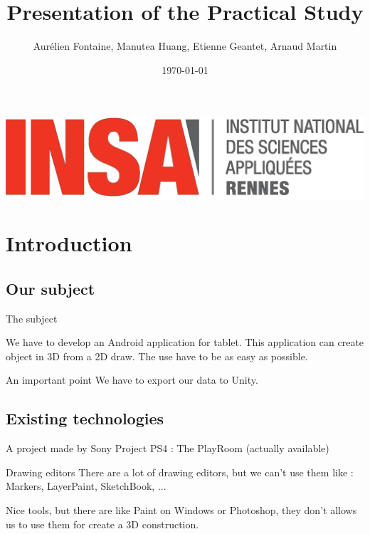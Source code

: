 \documentclass[a4paper,10pt]{beamer}
\title{Presentation of the Practical Study}
\author[Groupe 3INFO]{Aurélien Fontaine, Manutea Huang, Etienne Geantet, Arnaud Martin}
\institute[INSA de Rennes]{Institut National des Sciences Appliquées de Rennes}
\date{\today}
\begin{document}
	\begin{frame}
		\begin{titlepage}
			\centerline{\includegraphics[scale=0.1]{images/logoINSA.jpg}}
		\end{titlepage}
	\end{frame}
	
	\begin{frame}
		\tableofcontents
	\end{frame}
	
	\section{Introduction}
	
		\subsection{Our subject}
	
			\begin{frame}{The subject}
				
				We have to develop an Android application for tablet. This application can create object in 3D from a 2D draw. The use have to be as easy as possible.
				
				\begin{block}{An important point}
					We have to export our data to Unity.
				\end{block}
			\end{frame}
			
		\subsection{Existing technologies}
			
			\begin{frame}{A project made by Sony}
				Project PS4 : The PlayRoom (actually available)
			\end{frame}
			
			\begin{frame}{Drawing editors}
				There are a lot of drawing editors, but we can't use them like : Markers, LayerPaint, SketchBook, ...
				
				Nice tools, but there are like Paint on Windows or Photoshop, they don't allows us to use them for create a 3D construction.
			\end{frame}
		
\end{document}

